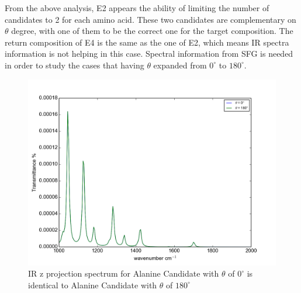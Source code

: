 From the above analysis, E2 appears the ability of limiting the number of candidates to 2 for each amino acid. These two candidates are complementary on $\theta$ degree, with one of them to be the correct one for the target composition. The return composition of E4 is the same as the one of E2, which means IR spectra information is not helping in this case. Spectral information from SFG is needed in order to study the cases that having $\theta$ expanded from $0^{\circ}$ to $180^{\circ}$.\\



\begin{figure}[!ht] 
\centering
\includegraphics[scale=0.7]{Figures/Ala_candidates_plotting_ir_z_2.png}
\caption{IR z projection spectrum for Alanine Candidate with $\theta$ of $0^{\circ}$ is identical to Alanine Candidate with $\theta$ of $180^{\circ}$} \label{fig:5.7}
\end{figure}

